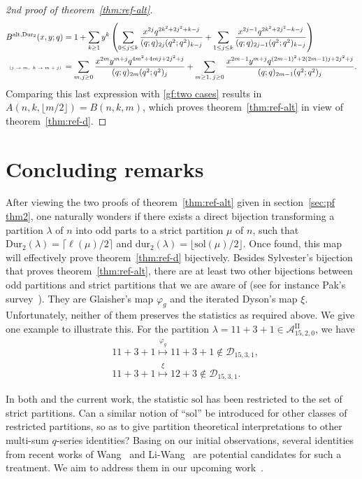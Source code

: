 \documentclass[11pt,reqno]{amsart}
\numberwithin{equation}{section}
\theoremstyle{plain}
\theoremstyle{definition}
\theoremstyle{named}
\def\cD{\mathcal{D}}
\def\A2{\mathcal{A}^{\mathrm{II}}}
\def\la{\lambda}
\def\sol{\mathrm{sol}}
\def\Dur{\mathrm{Dur}}
\def\dur{\mathrm{dur}}
\def\alt{\mathrm{alt}}
\begin{document}
\begin{proof}[2nd proof of theorem~\ref{thm:ref-alt}]
\begin{align*}
B^{\alt,\Dur_2}(x,y;q) &= 1+\sum_{k\ge 1}y^k\left(\sum_{0\le j\le k}\frac{x^{2j}q^{2k^2+2j^2+k-j}}{(q;q)_{2j}(q^2;q^2)_{k-j}}+\sum_{1\le j\le k}\frac{x^{2j-1}q^{2k^2+2j^2-k-j}}{(q;q)_{2j-1}(q^2;q^2)_{k-j}}\right)\\
\text{\tiny $(j\to m,~k\to m+j)$} \: &= \sum_{m,j\ge 0}\frac{x^{2m}y^{m+j}q^{4m^2+4mj+2j^2+j}}{(q;q)_{2m}(q^2;q^2)_j}+\sum_{m\ge 1,\: j\ge 0}\frac{x^{2m-1}y^{m+j}q^{(2m-1)^2+2(2m-1)j+2j^2+j}}{(q;q)_{2m-1}(q^2;q^2)_j}.
\end{align*}
Comparing this last expression with \eqref{gf:two cases} results in $A(n,k,\lfloor m/2 \rfloor)=B(n,k,m)$, which proves theorem~\ref{thm:ref-alt} in view of theorem~\ref{thm:ref-d}.
\end{proof}



\section{Concluding remarks}\label{sec:conclusion}

After viewing the two proofs of theorem~\ref{thm:ref-alt} given in section~\ref{sec:pf thm2}, one naturally wonders if there exists a direct bijection transforming a partition $\la$ of $n$ into odd parts to a strict partition $\mu$ of $n$, such that $\Dur_2(\la)=\lceil\ell(\mu)/2\rceil$ and $\dur_2(\la)=\lfloor\sol(\mu)/2\rfloor$. Once found, this map will effectively prove theorem~\ref{thm:ref-d} bijectively. Besides Sylvester's bijection that proves theorem~\ref{thm:ref-alt}, there are at least two other bijections between odd partitions and strict partitions that we are aware of (see for instance Pak's survey~\cite[Sect.~3]{pak06}). They are Glaisher's map $\varphi_{g}$ and the iterated Dyson's map $\xi$. Unfortunately, neither of them preserves the statistics as required above. We give one example to illustrate this. For the partition $\la=11+3+1\in\A2_{15,2,0}$, we have
\begin{align*}
& 11+3+1\stackrel{\varphi_{g}}{\mapsto} 11+3+1\not\in\cD_{15,3,1},\\
& 11+3+1\stackrel{\xi}{\mapsto} 12+3\not\in\cD_{15,3,1}.
\end{align*}

In both \cite{FL24} and the current work, the statistic $\sol$ has been restricted to the set of strict partitions. Can a similar notion of ``$\sol$'' be introduced for other classes of restricted partitions, so as to give partition theoretical interpretations to other multi-sum $q$-series identities? Basing on our initial observations, several identities from recent works of Wang~\cite{wan24} and Li-Wang~\cite{LW24} are potential candidates for such a treatment. We aim to address them in our upcoming work~\cite{FL25}.
\end{document}
